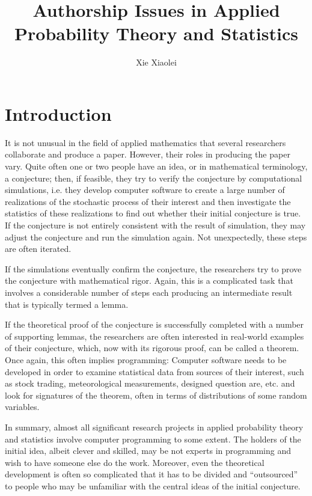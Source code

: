 \documentclass{article}
\title{Authorship Issues in Applied Probability Theory and Statistics}
\author{Xie Xiaolei}
\begin{document}
\maketitle

\section{Introduction}
It is not unusual in the field of applied mathematics that several
researchers collaborate and produce a paper. However, their roles in
producing the paper vary. Quite often one or two people have an idea,
or in mathematical terminology, a conjecture; then, if feasible, they
try to verify the conjecture by computational simulations, i.e. they
develop computer software to create a large number of
realizations of the stochastic process of their interest and then
investigate the statistics of these realizations to find out whether
their initial conjecture is true. If the conjecture is not entirely
consistent with the result of simulation, they may adjust the
conjecture and run the simulation again. Not unexpectedly, these steps
are often iterated.

If the simulations eventually confirm the conjecture, the researchers
try to prove the conjecture with mathematical rigor. Again, this is a
complicated task that involves a considerable number of steps each
producing an intermediate result that is typically termed a lemma.

If the theoretical proof of the conjecture is successfully completed
with a number of supporting lemmas, the researchers are often
interested in real-world examples of their conjecture, which, now with
its rigorous proof, can be called a theorem. Once again, this often
implies programming: Computer software needs to be developed in order
to examine statistical data from sources of their interest, such as
stock trading, meteorological measurements, designed question are,
etc. and look for signatures of the theorem, often in terms of
distributions of some random variables.

In summary, almost all significant research projects in applied
probability theory and statistics involve computer programming to some
extent. The holders of the initial idea, albeit clever and skilled,
may be not experts in programming and wish to have someone else do the work.
Moreover, even the theoretical development is often so
complicated that it has to be divided and ``outsourced'' to people who
may be unfamiliar with the central ideas of the initial conjecture.
\end{document}
